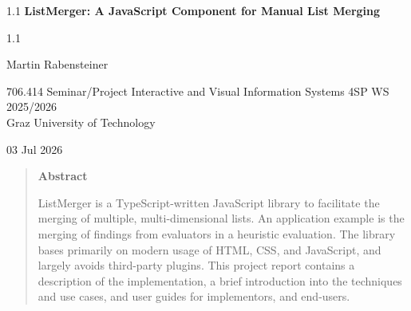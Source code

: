 \documentclass[11pt,onecolumn,twoside]{report}
\newcommand{\thistitle}{ListMerger: A JavaScript Component for Manual List Merging}  %
\newcommand{\thissubject}{}  %
\newcommand{\thisauthor}{Martin Rabensteiner}          %
\newcommand{\thisdate}{03 Jul 2026}  %
\begin{document}
\unixdate

\normalsize
\pagestyle{empty}         %




\begin{titlepage}

\begin{center}

\begin{spacing}{1.1}
\Large\sffamily\bfseries
\thistitle
\end{spacing}

\ifstrempty{\thissubject}{}%
{%
\begin{spacing}{1.1}
\large\sffamily\bfseries
\thissubject
\end{spacing}
}


\vspace{1cm}

{\large\sffamily \thisauthor}


\vspace{1cm}



{\large
706.414 Seminar/Project Interactive and Visual Information Systems 4SP WS 2025/2026 \\
Graz University of Technology \\[1cm]
}


\vspace{1cm}

\thisdate

\end{center}



\vspace{2cm}

\begin{quote}
\begin{center}
{\large\sffamily\bfseries Abstract}
\end{center}
ListMerger is a TypeScript-written JavaScript library to facilitate the
merging of multiple, multi-dimensional lists. An application example is
the merging of findings from evaluators in a heuristic evaluation. The
library bases primarily on modern usage of HTML, CSS, and JavaScript,
and largely avoids third-party plugins. This project report contains a
description of the implementation, a brief introduction into the
techniques and use cases, and user guides for implementors, and
end-users.
\end{quote}


\end{titlepage}
\end{document}

